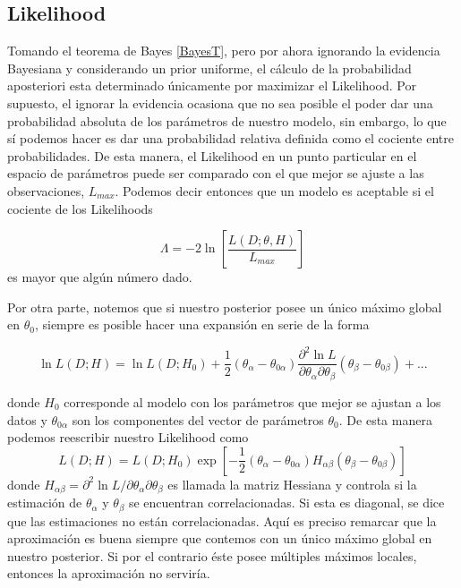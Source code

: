 \documentclass[10.5pt,prb,
               showpacs,            %
               preprintnumbers,     %
               aps,                 %
               prl,          	    %
               letterpaper,             %
               superscriptaddress,      %
               nofootinbib,         %
               tightenlines,        %
               floats,floatfix      %
               ,usenatbib]{revtex4-1}%
\begin{document}
\subsection{Likelihood}

Tomando el teorema de Bayes \eqref{BayesT}, pero por ahora ignorando la evidencia Bayesiana y considerando 
un prior uniforme, el c\'alculo de la probabilidad aposteriori esta determinado \'unicamente por maximizar el Likelihood. 
Por supuesto, el ignorar la evidencia ocasiona que no sea posible el poder dar una probabilidad absoluta 
de los par\'ametros de nuestro modelo, sin embargo, lo que s\'i podemos hacer es dar una probabilidad relativa 
definida como el cociente entre probabilidades. De esta manera, el Likelihood en un punto particular en el espacio 
de par\'ametros puede ser comparado con el que mejor se ajuste a las observaciones, $L_{max}$. Podemos decir 
entonces que un modelo es aceptable si el cociente de los Likelihoods

	\begin{equation}
		\Lambda=-2\ln\left[\frac{L(D;\theta,H)}{L_{max}}\right]
	\end{equation}
es mayor que alg\'un n\'umero dado.

Por otra parte, notemos que si nuestro posterior posee un \'unico m\'aximo global en $\theta_0$, 
siempre es posible hacer una expansi\'on en serie de la forma

	\begin{equation}
		\ln L(D;H)=\ln L(D;H_0)+\frac{1}{2}(\theta_\alpha-\theta_{0\alpha})\frac{\partial^2\ln L}
			{\partial\theta_\alpha \partial\theta_\beta}(\theta_\beta-\theta_{0\beta})+...
	\end{equation}

\noindent
donde $H_0$ corresponde al modelo con los par\'ametros que mejor se ajustan a los datos y 
$\theta_{0\alpha}$ son los componentes del vector de par\'ametros $\theta_0$.
De esta manera podemos reescribir nuestro Likelihood como
%	
	\begin{equation}\label{GLik}
		L(D;H)=L(D;H_0)\exp \left[-\frac{1}{2}(\theta_\alpha-\theta_{0\alpha})H_{\alpha\beta}(\theta_\beta-\theta_{0\beta})\right]
	\end{equation}
%
donde
%
$		H_{\alpha\beta}=\partial^2\ln L/ \partial\theta_\alpha \partial\theta_\beta$
%
es llamada la matriz Hessiana y controla si la estimaci\'on de $\theta_\alpha$ y $\theta_\beta$ 
se encuentran correlacionadas. Si esta es diagonal, se dice que las estimaciones no est\'an correlacionadas.
%
Aqu\'i es preciso remarcar que la aproximaci\'on es buena siempre que contemos con un \'unico m\'aximo 
global en nuestro posterior. Si por el contrario \'este posee m\'ultiples m\'aximos locales, entonces la aproximaci\'on no servir\'ia.
\end{document}
